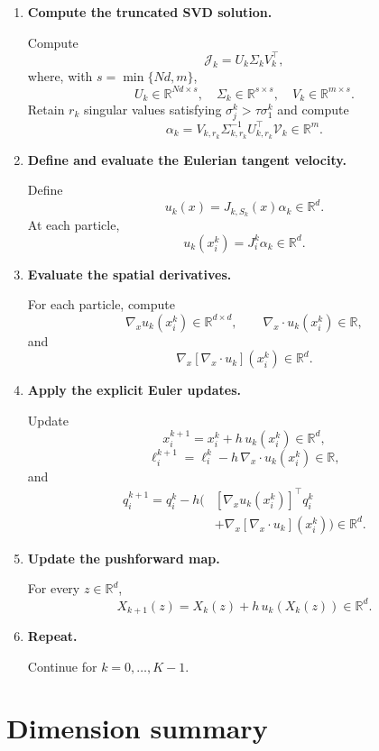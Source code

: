 \documentclass[11pt]{article}
\newcommand{\R}{\mathbb{R}}
\begin{document}
\begin{enumerate}[leftmargin=2.3em,label=\textbf{Step \arabic*.}]
    \item \textbf{Compute the truncated SVD solution.}

    Compute
    \[
    \mathcal J_k=U_k\Sigma_kV_k^\top,
    \]
    where, with $s=\min\{Nd,m\}$,
    \[
    U_k\in\R^{Nd\times s},
    \quad
    \Sigma_k\in\R^{s\times s},
    \quad
    V_k\in\R^{m\times s}.
    \]
    Retain $r_k$ singular values satisfying $\sigma_j^k>\tau\sigma_1^k$ and compute
    \[
    \alpha_k
    =
    V_{k,r_k}\Sigma_{k,r_k}^{-1}U_{k,r_k}^\top\mathcal V_k
    \in\R^m.
    \]

    \item \textbf{Define and evaluate the Eulerian tangent velocity.}

    Define
    \[
    u_k(x)=J_{k,S_k}(x)\alpha_k\in\R^d.
    \]
    At each particle,
    \[
    u_k(x_i^k)=J_i^k\alpha_k\in\R^d.
    \]

    \item \textbf{Evaluate the spatial derivatives.}

    For each particle, compute
    \[
    \nabla_xu_k(x_i^k)\in\R^{d\times d},
    \qquad
    \nabla_x\cdot u_k(x_i^k)\in\R,
    \]
    and
    \[
    \nabla_x[\nabla_x\cdot u_k](x_i^k)\in\R^d.
    \]

    \item \textbf{Apply the explicit Euler updates.}

    Update
    \[
    x_i^{k+1}
    =
    x_i^k+h\,u_k(x_i^k)
    \in\R^d,
    \]
    \[
    \ell_i^{k+1}
    =
    \ell_i^k-h\,\nabla_x\cdot u_k(x_i^k)
    \in\R,
    \]
    and
    \[
    \begin{aligned}
    q_i^{k+1}
    =
    q_i^k-h\Big(&[\nabla_xu_k(x_i^k)]^\top q_i^k\\
    &+\nabla_x[\nabla_x\cdot u_k](x_i^k)\Big)
    \in\R^d.
    \end{aligned}
    \]

    \item \textbf{Update the pushforward map.}

    For every $z\in\R^d$,
    \[
    X_{k+1}(z)
    =
    X_k(z)+h\,u_k(X_k(z))
    \in\R^d.
    \]

    \item \textbf{Repeat.}

    Continue for $k=0,\ldots,K-1$.
\end{enumerate}

\section{Dimension summary}
\end{document}
